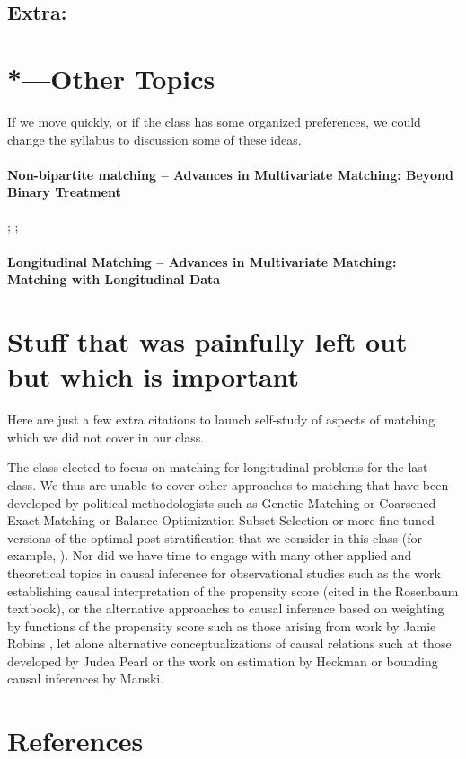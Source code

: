 \documentclass[10pt]{article}
\begin{document}
\cite{cornfield:1959}

\cite{hosman2010}

\subsection{Extra:}

\citealp[Chap 4]{rosenbaum:2002}

\citealp[Chap 3, 14]{rosenbaum2010design}

\cite{imbens2003sea}


\section{*---Other Topics}

If we move quickly, or if the class has some organized preferences, we could
change the syllabus to discussion some of these ideas.


\paragraph{Non-bipartite matching -- Advances in Multivariate Matching: Beyond Binary Treatment }
\citealp[Chap 11]{rosenbaum2010design}; \cite{lu2011optimal}; \cite{imaivandyk:04}

\paragraph{Longitudinal Matching -- Advances in Multivariate Matching: Matching with Longitudinal Data}
\citealp[Chap 12]{rosenbaum2010design}


\section{Stuff that was painfully left out but which is important}

Here are just a few extra citations to launch self-study of aspects of
matching which we did not cover in our class.

The class elected to focus on matching for longitudinal problems for
the last class. We thus are unable to cover other approaches to
matching that have been developed by political methodologists such as
Genetic Matching \citep{diamond2006genetic, sekhon2007multivariate} or
Coarsened Exact Matching \citep{iacus2009causal,
  iacus2011multivariate} or Balance Optimization Subset Selection
\citep{Nikolaevetal:12} or more fine-tuned versions of the optimal
post-stratification that we consider in this class (for example,
\citep{zubizarreta2012using}). Nor did we have time to engage with
many other applied and theoretical topics in causal inference for
observational studies such as the work establishing causal
interpretation of the propensity score (cited in the Rosenbaum
textbook), or the alternative approaches to causal inference based on
weighting by functions of the propensity score such as those arising
from work by Jamie Robins \citep{glynn2010introduction}, let alone
alternative conceptualizations of causal relations such at those
developed by Judea Pearl \citep{JudeaPearl2000a} or the work on
estimation by Heckman or bounding causal inferences by Manski.


\section{References}


\end{document}
